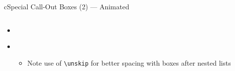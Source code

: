 \begin{myslidefragile}{c}{Special Call-Out Boxes (2) --- Animated}

\begin{columns}

\begin{column}{1\textwidth}

\begin{itemize}[<+->]

\itembox
\begin{myremark}
\lipsum[1][1]
\end{myremark}

\item \lipsum[1][6]%

\itembox
\begin{myimportant}
\lipsum[1][1-2]
\end{myimportant}

\itembox
\begin{myfuture}
\lipsum[1][1]
\end{myfuture}

\item \lipsum[1][6]

\begin{itemize}

\item Note use of \lstinline{\unskip} for better spacing with boxes after nested lists

\end{itemize}

\unskip

\itembox
\begin{myquestion}
\lipsum[1][2-3]
\end{myquestion}

\end{itemize}

\end{column}

\end{columns}

\end{myslidefragile}

